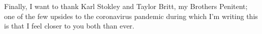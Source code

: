 \documentclass[final]{nuthesis}
\theoremstyle{definition}
\numberwithin{theorem}{section}
\numberwithin{lemma}{section}
\numberwithin{corollary}{section}
\numberwithin{definition}{section}
\numberwithin{equation}{section}
\begin{document}
\begin{acknowledgments}
	Finally, I want to thank Karl Stokley and Taylor Britt, my Brothers Penitent; one of the few upsides to the coronavirus pandemic during which I'm writing this is that I feel closer to you both than ever.
\end{acknowledgments}


\tableofcontents

\listoffigures
\listoftables

\mainmatter






\backmatter

%


\end{document}
